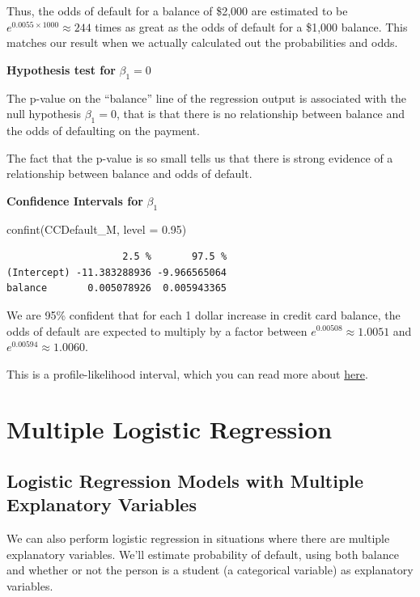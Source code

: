 \documentclass[
  letterpaper,
  DIV=11,
  numbers=noendperiod]{scrreprt}
\newenvironment{Shaded}{\begin{snugshade}}{\end{snugshade}}
\newcommand{\AttributeTok}[1]{\textcolor[rgb]{0.40,0.45,0.13}{#1}}
\newcommand{\FloatTok}[1]{\textcolor[rgb]{0.68,0.00,0.00}{#1}}
\newcommand{\FunctionTok}[1]{\textcolor[rgb]{0.28,0.35,0.67}{#1}}
\newcommand{\NormalTok}[1]{\textcolor[rgb]{0.00,0.23,0.31}{#1}}
\begin{document}
Thus, the odds of default for a balance of \$2,000 are estimated to be
\(e^{0.0055\times 1000}\approx 244\) times as great as the odds of
default for a \$1,000 balance. This matches our result when we actually
calculated out the probabilities and odds.

\textbf{Hypothesis test for} \(\beta_1=0\)

The p-value on the ``balance'' line of the regression output is
associated with the null hypothesis \(\beta_1=0\), that is that there is
no relationship between balance and the odds of defaulting on the
payment.

The fact that the p-value is so small tells us that there is strong
evidence of a relationship between balance and odds of default.

\textbf{Confidence Intervals for} \(\beta_1\)

\begin{Shaded}
\begin{Highlighting}[]
\FunctionTok{confint}\NormalTok{(CCDefault\_M, }\AttributeTok{level =} \FloatTok{0.95}\NormalTok{)}
\end{Highlighting}
\end{Shaded}

\begin{verbatim}
                    2.5 %       97.5 %
(Intercept) -11.383288936 -9.966565064
balance       0.005078926  0.005943365
\end{verbatim}

We are 95\% confident that for each 1 dollar increase in credit card
balance, the odds of default are expected to multiply by a factor
between \(e^{0.00508}\approx 1.0051\) and \(e^{0.00594}\approx 1.0060\).

This is a profile-likelihood interval, which you can read more about
\href{https://rpubs.com/FJRubio/PLCIN}{here}.

\section{Multiple Logistic
Regression}\label{multiple-logistic-regression}

\subsection{Logistic Regression Models with Multiple Explanatory
Variables}\label{logistic-regression-models-with-multiple-explanatory-variables}

We can also perform logistic regression in situations where there are
multiple explanatory variables. We'll estimate probability of default,
using both balance and whether or not the person is a student (a
categorical variable) as explanatory variables.
\end{document}
